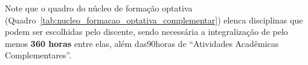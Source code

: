 Note que o quadro do núcleo de formação optativa (Quadro~\ref{tab:nucleo_formacao_optativa_complementar}) elenca disciplinas que podem ser escolhidas pelo discente, sendo necessária a integralização de pelo menos \textbf{360 horas} entre elas, além das90horas de ``Atividades Acadêmicas Complementares''.
